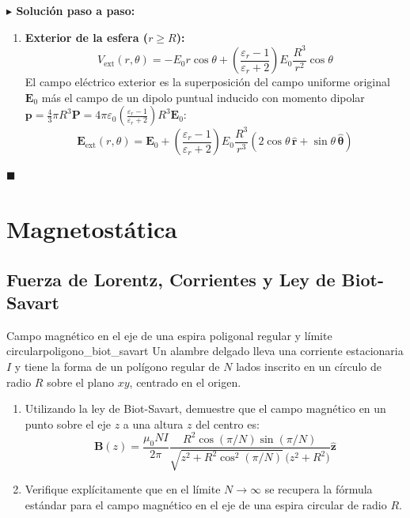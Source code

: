 \documentclass[11pt,a4paper]{book}
\newenvironment{solucion}{%
    \par\medskip\noindent\textbf{\color{blue!65!black}\Large $\blacktriangleright$ Solución paso a paso:}\par\medskip
}{%
    \hfill$\blacksquare$\par\bigskip
}
\newcommand{\rhat}{\hat{\bm{r}}}
\newcommand{\thetahat}{\hat{\bm{\theta}}}
\newcommand{\zhat}{\hat{\bm{z}}}
\newcommand{\Evec}{\bm{E}}
\newcommand{\Pvec}{\bm{P}}
\newcommand{\Bvec}{\bm{B}}
\begin{document}
\begin{solucion}
\begin{enumerate}
    \item \textbf{Exterior de la esfera ($r \ge R$):}
    \begin{equation}
        V_{\text{ext}}(r,\theta) = -E_0 r \cos\theta + \left(\frac{\varepsilon_r - 1}{\varepsilon_r + 2}\right) E_0 \frac{R^3}{r^2}\cos\theta
    \end{equation}
    El campo eléctrico exterior es la superposición del campo uniforme original $\Evec_0$ más el campo de un dipolo puntual inducido con momento dipolar $\bm{p} = \frac{4}{3}\pi R^3 \Pvec = 4\pi\varepsilon_0 \left(\frac{\varepsilon_r - 1}{\varepsilon_r + 2}\right) R^3 \Evec_0$:
    \begin{equation}
        \Evec_{\text{ext}}(r,\theta) = \Evec_0 + \left(\frac{\varepsilon_r - 1}{\varepsilon_r + 2}\right) E_0 \frac{R^3}{r^3}\left(2\cos\theta\,\rhat + \sin\theta\,\thetahat\right)
    \end{equation}
\end{enumerate}
\end{solucion}

\chapter{Magnetostática}

\section{Fuerza de Lorentz, Corrientes y Ley de Biot-Savart}

\begin{ejercicio}{Campo magnético en el eje de una espira poligonal regular y límite circular}{poligono_biot_savart}
Un alambre delgado lleva una corriente estacionaria $I$ y tiene la forma de un polígono regular de $N$ lados inscrito en un círculo de radio $R$ sobre el plano $xy$, centrado en el origen.
\begin{enumerate}[label=\alph*)]
    \item Utilizando la ley de Biot-Savart, demuestre que el campo magnético en un punto sobre el eje $z$ a una altura $z$ del centro es:
    \begin{equation*}
        \Bvec(z) = \frac{\mu_0 N I}{2\pi} \frac{R^2 \cos(\pi/N)\sin(\pi/N)}{\sqrt{z^2 + R^2\cos^2(\pi/N)}\,\big(z^2 + R^2\big)} \zhat
    \end{equation*}
    \item Verifique explícitamente que en el límite $N \to \infty$ se recupera la fórmula estándar para el campo magnético en el eje de una espira circular de radio $R$.
\end{enumerate}
\end{ejercicio}
\end{document}
